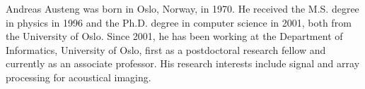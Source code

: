 \documentclass[journal]{IEEEtran}
\begin{document}


\begin{IEEEbiography}{Andreas Austeng}
was born in Oslo, Norway, in 1970. He received the M.S. degree in physics in 1996 and the Ph.D. degree in computer science in 2001, both from the University of Oslo. Since 2001, he has been working at the Department of Informatics, University of Oslo, first as a postdoctoral research fellow and currently as an associate professor. His research interests include signal and array processing for acoustical imaging.
\end{IEEEbiography}

\end{document}
